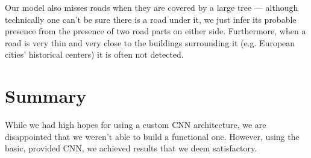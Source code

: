 \documentclass[11pt,conference,compsocconf]{IEEEtran}
\begin{document}
Our model also misses roads when they are covered by a large tree --- although technically one can't be sure there is a road under it, we just infer its probable presence from the presence of two road parts on either side. Furthermore, when a road is very thin and very close to the buildings surrounding it (e.g. European cities' historical centers) it is often not detected.

\section{Summary}
While we had high hopes for using a custom CNN architecture, we are disappointed that we weren't able to build a functional one. However, using the basic, provided CNN, we achieved results that we deem satisfactory.
\end{document}
